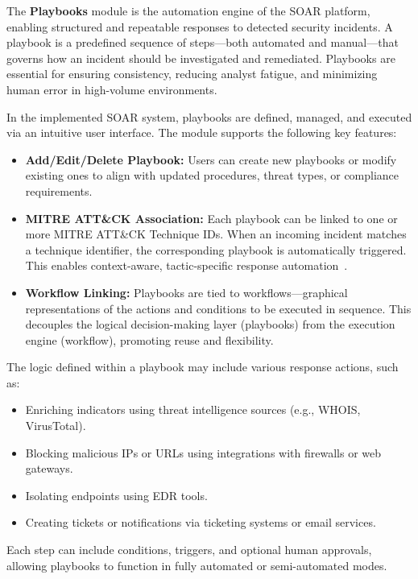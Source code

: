 The \textbf{Playbooks} module is the automation engine of the SOAR platform, enabling structured and repeatable responses to detected security incidents. A playbook is a predefined sequence of steps—both automated and manual—that governs how an incident should be investigated and remediated. Playbooks are essential for ensuring consistency, reducing analyst fatigue, and minimizing human error in high-volume environments.

In the implemented SOAR system, playbooks are defined, managed, and executed via an intuitive user interface. The module supports the following key features:

\begin{itemize}[noitemsep,topsep=0pt]
    \item \textbf{Add/Edit/Delete Playbook:} Users can create new playbooks or modify existing ones to align with updated procedures, threat types, or compliance requirements.
    
    \item \textbf{MITRE ATT\&CK Association:} Each playbook can be linked to one or more MITRE ATT\&CK Technique IDs. When an incoming incident matches a technique identifier, the corresponding playbook is automatically triggered. This enables context-aware, tactic-specific response automation~\cite{mitre}.
    
    \item \textbf{Workflow Linking:} Playbooks are tied to workflows—graphical representations of the actions and conditions to be executed in sequence. This decouples the logical decision-making layer (playbooks) from the execution engine (workflow), promoting reuse and flexibility.
\end{itemize}

The logic defined within a playbook may include various response actions, such as:
\begin{itemize}[noitemsep,topsep=0pt]
    \item Enriching indicators using threat intelligence sources (e.g., WHOIS, VirusTotal).
    \item Blocking malicious IPs or URLs using integrations with firewalls or web gateways.
    \item Isolating endpoints using EDR tools.
    \item Creating tickets or notifications via ticketing systems or email services.
\end{itemize}

Each step can include conditions, triggers, and optional human approvals, allowing playbooks to function in fully automated or semi-automated modes.

